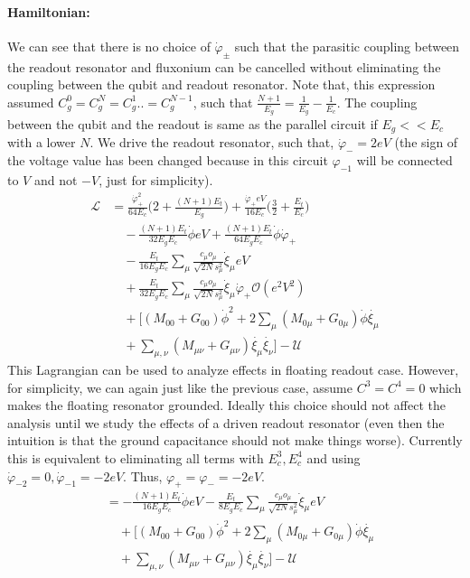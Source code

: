 \documentclass[%
reprint,
superscriptaddress,
 amsmath,amssymb,
 aps,
 prx,
longbibliography,
floatfix,
]{revtex4-2}
\begin{document}
\paragraph{Hamiltonian:} We can see that there is no choice of $\dot{\varphi}_{\pm}$ such that the parasitic coupling between the readout resonator and fluxonium can be cancelled without eliminating the coupling between the qubit and readout resonator. Note that, this expression assumed $C_g^0=C_g^N=C_g^1..=C_g^{N-1}$, such that  $\frac{N+1}{E_g}=\frac{1}{E_g}-\frac{1}{E_c}$. The coupling between the qubit and the readout is same as the parallel circuit if $E_g<<E_c$ with a lower $N$. We drive the readout resonator, such that, $\dot{\varphi}_{-}=2eV$ (the sign of the voltage value has been changed because in this circuit $\varphi_{-1}$ will be connected to $V$ and not $-V$, just for simplicity).
\begin{align}
    \mathcal{L}&=\frac{\dot{\varphi}_{+}^2}{64E_c}\Big(2+\frac{(N+1)E_t}{E_g}\Big)+\frac{\dot{\varphi}_{+}eV}{16E_c}\Big(\frac{3}{2}+\frac{E_t}{E_c}\Big)\nonumber\\
    &\quad-\frac{(N+1)E_t}{32E_gE_c}\dot{\phi}eV+\frac{(N+1)E_t}{64E_gE_c}\dot{\phi}\dot{\varphi}_{+}\nonumber\\
    &\quad -\frac{E_t}{16E_gE_c} \sum_\mu\frac{c_\mu o_\mu}{\sqrt{2N}s_\mu^2}  \dot{\xi}_\mu eV\nonumber\\
    &\quad+\frac{E_t}{32E_gE_c} \sum_\mu\frac{c_\mu o_\mu}{\sqrt{2N}s_\mu^2}  \dot{\xi}_\mu\dot{\varphi}_{+}\mathcal{O}(e^2V^2)\nonumber\\
    &\quad+\Big[(M_{00}+G_{00})\dot{\phi}^2+2\sum_{\mu}(M_{0\mu}+G_{0\mu})\dot{\phi}\dot{\xi_\mu}\nonumber\\
    &\quad+\sum_{\mu,\nu}(M_{\mu\nu}+G_{\mu\nu})\dot{\xi_\mu}\dot{\xi_\nu}\Big]-\mathcal{U}
\end{align}
This Lagrangian can be used to analyze effects in floating readout case. However, for simplicity, we can again just like the previous case, assume $C^3=C^4=0$ which makes the floating resonator grounded. Ideally this choice should not affect the analysis until we study the effects of a driven readout resonator (even then the intuition is that the ground capacitance should not make things worse). Currently this is equivalent to eliminating all terms with $E_c^3, E_c^4$ and using $\dot \varphi_{-2}=0, \dot\varphi_{-1}=-2eV$. Thus, $\varphi_{+}=\varphi_{-}=-2eV$. 
\begin{align}
    &=-\frac{(N+1)E_t}{16E_gE_c}\dot{\phi}eV-\frac{E_t}{8E_gE_c} \sum_\mu\frac{c_\mu o_\mu}{\sqrt{2N}s_\mu^2}  \dot{\xi}_\mu eV\nonumber\\
    &\quad+\Big[(M_{00}+G_{00})\dot{\phi}^2+2\sum_{\mu}(M_{0\mu}+G_{0\mu})\dot{\phi}\dot{\xi_\mu}\nonumber\\&\quad+\sum_{\mu,\nu}(M_{\mu\nu}+G_{\mu\nu})\dot{\xi_\mu}\dot{\xi_\nu}\Big]-\mathcal{U}
\end{align}
\end{document}
